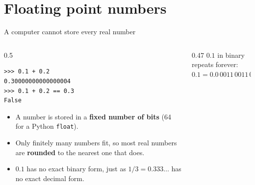 \documentclass[aspectratio=169]{beamer}
\begin{document}
\section{Floating point numbers}

\begin{frame}[fragile]{A computer cannot store every real number}
\begin{columns}[T]
\begin{column}{0.5\textwidth}
\small
\begin{lstlisting}
>>> 0.1 + 0.2
0.30000000000000004
>>> 0.1 + 0.2 == 0.3
False
\end{lstlisting}
\begin{itemize}
  \item A number is stored in a \textbf{fixed number of bits} (64 for a Python \texttt{float}).
  \item Only finitely many numbers fit, so most real numbers are \textbf{rounded} to the nearest one that does.
  \item $0.1$ has no exact binary form, just as $1/3 = 0.333\ldots$ has no exact decimal form.
\end{itemize}
\end{column}
\begin{column}{0.47\textwidth}
\centering
\small $0.1$ in binary repeats forever:\\[4pt]
$0.1 = 0.0\,0011\,0011\,0011\,0011\ldots_2$\\[10pt]
\end{column}
\end{columns}
\end{frame}
\end{document}

